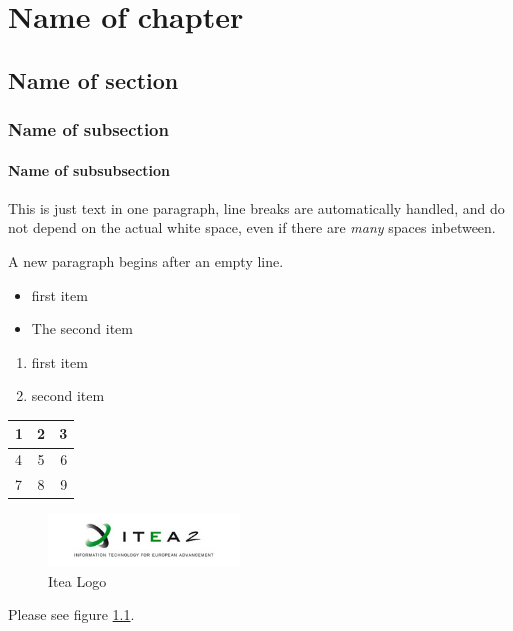 \documentclass{template/openetcs_report}
\begin{document}

\chapter{Name of chapter}
\section{Name of section}
\subsection{Name of subsection}
\subsubsection{Name of subsubsection}

This is just text in one paragraph, line breaks are automatically handled, and do not depend on the actual
white
space, even if there are \emph{many}                                  spaces                            inbetween.

A new paragraph begins after an empty line.

\begin{itemize}
  \item first item
  \item The second item
\end{itemize}

\begin{enumerate}
  \item first item
  \item second item
\end{enumerate}

  \begin{tabular}{|  l | c || r | }
    \hline
    1 & 2 & 3 \\ \hline
    4 & 5 & 6 \\ \hline
    7 & 8 & 9 \\
    \hline
  \end{tabular}

\begin{figure}
  \centering
  \includegraphics[width=2in]{itea}
  \caption{Itea Logo}
  \label{fig:itea2}
\end{figure}

Please see figure \ref{fig:itea2}.
\end{document}
